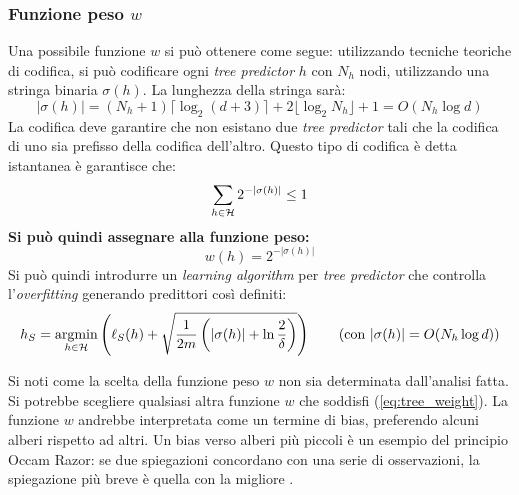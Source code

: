 \subsubsection{Funzione peso \texorpdfstring{$w$}{w}}
Una possibile funzione $w$ si può ottenere come segue: utilizzando tecniche teoriche
di codifica, si può codificare ogni \textit{tree predictor} $h$ con $N_h$ nodi,
utilizzando una stringa binaria $\sigma(h)$. La lunghezza della stringa sarà:
$$|\sigma(h)|=(N_h+1)\lceil\log_2{(d+3)}\rceil+2\lfloor\log_2{N_h}\rfloor+1
=O(N_h\log{d})$$
La codifica deve garantire che non esistano due \textit{tree predictor} tali che la
codifica di uno sia prefisso della codifica dell'altro. Questo tipo di codifica è
detta istantanea è garantisce che:
$$ \sum_{h\in\mathcal{H}} 2^{-|\sigma(h)|} \leq 1 $$
\textbf{Si può quindi assegnare alla funzione peso:}
$$ w(h) = 2^{\displaystyle-|\sigma(h)|} $$
Si può quindi introdurre un \textit{learning algorithm} per \textit{tree predictor}
che controlla l'\textit{overfitting} generando predittori così definiti:
\begin{equation} h_S = \argmin_{h\in\Hpred}\left(
    \ell_S(h)+\sqrt{\frac{1}{2m}\left(|\sigma(h)|
    +\ln{\frac{2}{\delta}}\right)}
\right) \tag{con $|\sigma(h)| = O(N_h\log{d})$} \end{equation}

Si noti come la scelta della funzione peso $w$ non sia determinata dall'analisi
fatta. Si potrebbe scegliere qualsiasi altra funzione $w$ che soddisfi
(\ref{eq:tree_weight}). La funzione $w$ andrebbe interpretata come un termine di
bias, preferendo alcuni alberi rispetto ad altri. Un bias verso alberi più piccoli
è un esempio del principio Occam Razor: se due spiegazioni concordano con una serie
di osservazioni, la spiegazione più breve è quella con la migliore .

